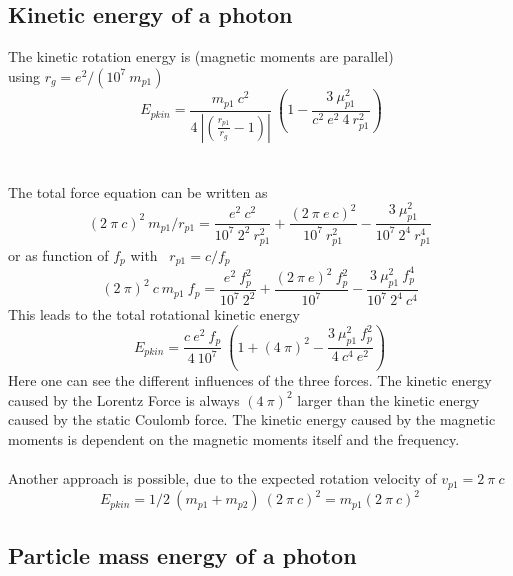 \documentclass[10pt,titlepage]{article}
\begin{document}
\subsection{Kinetic energy of a photon}
The kinetic rotation energy is (magnetic moments are parallel)
\\using $r_g=e^2/(10^7 \ m_{p1})$
\begin{equation}
\ E_{pkin}=\frac{m_{p1} \ c^2}{4 \ |(\frac{r_{p1}}{r_g}-1)|}    \ (1-\frac{3 \ \mu_{p1}^2}{c^2 \ e^2 \ 4 \ r_{p1}^2})
\end{equation}
\\\\
The total force equation can be written as\\
\begin{equation}
(2 \ \pi \ c)^2 \ m_{p1}/r_{p1}=\frac{e^2 \ c^2}{10^7 \ 2^2 \ r_{p1}^2}+\frac{(2 \ \pi \ e \ c)^2}{10^7 \ r_{p1}^2}-\frac{3 \ \mu_{p1}^2}{10^7 \ 2^4 \ r_{p1}^4}
\end{equation}
or as function of $f_p$ with \ $r_{p1}=c/f_p$
\begin{equation}
(2 \ \pi)^2 \ c \ m_{p1} \ f_p=\frac{e^2 \ f_p^2}{10^7 \ 2^2}+\frac{(2 \ \pi \ e)^2 \ f_p^2}{10^7}-\frac{3 \ \mu_{p1}^2 \ f_p^4}{10^7 \ 2^4 \ c^4}
\end{equation}
This leads to the total rotational kinetic energy
\begin{equation}\label{ph_Epkin}
E_{pkin}=\frac{c \ e^2 \ f_p}{4 \ 10^7} \ (1 + (4 \ \pi)^2-\frac{3 \ \mu_{p1}^2 \ f_p^2}{4 \ c^4 \ e^2})
\end{equation}
Here one can see the different influences of the three forces. The kinetic energy caused by the Lorentz Force is always $(4 \ \pi)^2$ larger than the kinetic energy caused by the static Coulomb force. The kinetic energy caused by the magnetic moments is dependent on the magnetic moments itself and the frequency.
\\\\
Another approach is possible, due to the expected rotation velocity of $ v_{p1}=2 \ \pi \ c$
\\
\begin{equation}
E_{pkin}= 1/2 \ (m_{p1} + m_{p2}) \ (2 \ \pi \ c)^2= m_{p1}(2 \ \pi \ c)^2
\end{equation}

\subsection{Particle mass energy of a photon}
\end{document}
